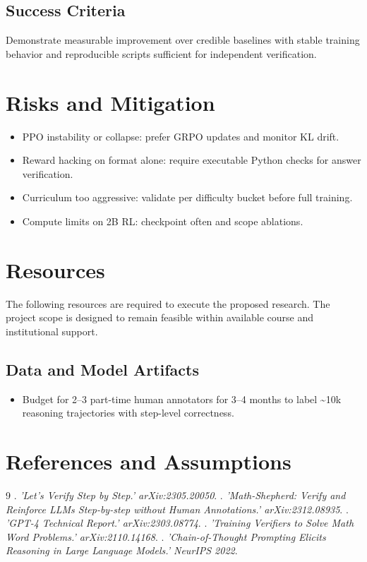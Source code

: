 \documentclass[11pt]{article}
\begin{document}
\subsection*{Success Criteria}
Demonstrate measurable improvement over credible baselines with stable training behavior and reproducible scripts sufficient for independent verification.
\section{Risks and Mitigation}
\begin{itemize}
\item PPO instability or collapse: prefer GRPO updates and monitor KL drift.
\item Reward hacking on format alone: require executable Python checks for answer verification.
\item Curriculum too aggressive: validate per difficulty bucket before full training.
\item Compute limits on 2B RL: checkpoint often and scope ablations.
\end{itemize}

\section{Resources}
\noindent The following resources are required to execute the proposed research. The project scope is designed to remain feasible within available course and institutional support.\par\vspace{0.6em}
\subsection*{Data and Model Artifacts}
\begin{itemize}[leftmargin=*,itemsep=0.35em,parsep=0pt,topsep=0.35em,partopsep=0pt]
  \item Budget for 2--3 part-time human annotators for 3--4 months to label \textasciitilde{}10k reasoning trajectories with step-level correctness.
\end{itemize}
\section{References and Assumptions}
\begin{thebibliography}{9}
   \citep{lightman2023}. \emph{'Let's Verify Step by Step.' arXiv:2305.20050}.
   \citep{wang2023}. \emph{'Math-Shepherd: Verify and Reinforce LLMs Step-by-step without Human Annotations.' arXiv:2312.08935}.
   \citep{openai2023}. \emph{'GPT-4 Technical Report.' arXiv:2303.08774}.
   \citep{cobbe2021}. \emph{'Training Verifiers to Solve Math Word Problems.' arXiv:2110.14168}.
   \citep{wei2022}. \emph{'Chain-of-Thought Prompting Elicits Reasoning in Large Language Models.' NeurIPS 2022}.
\end{thebibliography}
\end{document}
